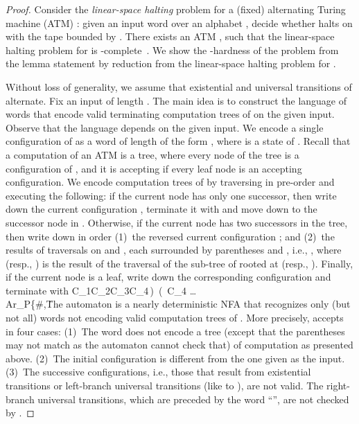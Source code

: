 \documentclass{CSML}
\begin{document}
\begin{proof}
\newcommand{\Ap}{\mathcal{A}_P}
\newcommand{\Ar}{\mathcal{A}_N}
\newcommand{\UATM}{{M}_U}
Consider the \emph{linear-space halting} problem for a (fixed) alternating Turing machine (ATM) :
given an input word  over an alphabet , decide whether  halts on  with the tape bounded by .
There exists an ATM , such that
the linear-space halting problem for  is -complete~\cite{Chandra:1981:ALT:322234.322243}.
We show the -hardness of the problem from the lemma statement by reduction from the 
linear-space halting problem for .

Without loss of generality, we assume that existential and universal transitions of  alternate. Fix an input of length .
The main idea is to construct the language  of words that encode valid terminating computation trees of  on the given input. 
Observe that the language  depends on the given input. 
We encode a single configuration of  as a word of length  of the form , where  is a state of . 
Recall that a computation of an ATM is a tree, where every node of the tree is a configuration of ,  
and it is accepting if every leaf node is an accepting configuration.
We encode computation trees   of  by traversing  in pre-order and executing the following:
if the current node has only one successor, then write down the current configuration , terminate it with  
and move down to the successor node in .
Otherwise, if the current node has two successors  in the tree, then write 
down in order (1)~the reversed current configuration ; and (2)~the results of traversals on  and , each surrounded  by parentheses  and , i.e.,
, where  (resp., ) is the result of the traversal of the sub-tree of  rooted at  (resp., ).
Finally, if the current node is a leaf, write down the corresponding configuration and terminate with C_1C_2C_3C_4\,\right)\, \left(\, C_{4} \ldots \\Ar\Ap\Sigma \cup \{\#,\. 
The automaton  is a nearly deterministic NFA that recognizes only (but not all) words 
not encoding valid computation trees of .
More precisely,  accepts in four cases:
(1)~The word does not encode a tree (except that the parentheses may not match as the automaton cannot check that) 
of computation as presented above.
(2)~The initial configuration is different from the one given as the input. 
(3)~The successive configurations, i.e., those that
result from existential transitions or left-branch universal transitions (like  to ), are not valid. 
The right-branch universal transitions, which are preceded by the word ``'', are not checked by . 

\end{proof}
\end{document}

